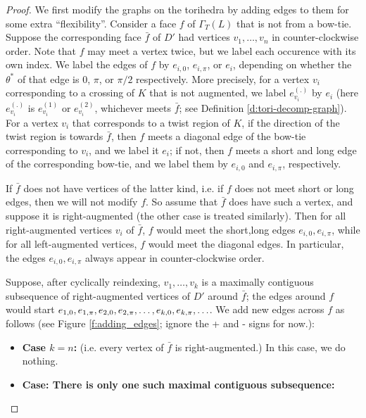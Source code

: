 \documentclass[11pt]{amsart}
\newcommand{\defref}[1]{Definition \ref{#1}}
\newcommand{\figref}[1]{Figure \ref{#1}}
\theoremstyle{plain}
\theoremstyle{definition}
\newcommand{\cm}{,\linebreak[1]}
\begin{document}
\begin{proof}
We first modify the graphs on the torihedra by adding edges
to them for some extra ``flexibility''.
Consider a face $f$ of $\Gamma_T(L)$ that is not from a bow-tie.
Suppose the corresponding face $\bar{f}$ of $D'$
had vertices $v_1,\ldots,v_n$ in counter-clockwise order.
Note that $f$ may meet a vertex twice,
but we label each occurence with its own index.
We label the edges of $f$ by $e_{i,0}$, $e_{i,\pi}$, or $e_i$,
depending on whether the $\theta^*$ of that edge
is $0$, $\pi$, or $\pi/2$ respectively.
More precisely, for a vertex $v_i$ corresponding to a crossing
of $K$ that is not augmented,
we label $e_{v_i}^{(.)}$ by $e_i$
(here $e_{v_i}^{(.)}$ is $e_{v_i}^{(1)}$ or $e_{v_i}^{(2)}$,
whichever meets $\bar{f}$; see \defref{d:tori-decomp-graph}).
For a vertex $v_i$ that corresponds to a twist region of $K$,
if the direction of the twist region is towards $\bar{f}$,
then $f$ meets a diagonal edge of the bow-tie corresponding to $v_i$,
and we label it $e_i$;
if not, then $f$ meets a short and long edge of the corresponding bow-tie,
and we label them by $e_{i,0}$ and $e_{i,\pi}$,
respectively.


If $\bar{f}$ does not have vertices of the latter kind,
i.e. if $f$ does not meet short or long edges,
then we will not modify $f$.
So assume that $\bar{f}$ does have such a vertex,
and suppose it is right-augmented
(the other case is treated similarly).
Then for all right-augmented vertices $v_i$ of $\bar{f}$,
$f$ would meet the short,long edges $e_{i,0},e_{i,\pi}$,
while for all left-augmented vertices,
$f$ would meet the diagonal edges.
In particular,
the edges $e_{i,0}, e_{i,\pi}$ always appear in counter-clockwise order.


Suppose, after cyclically reindexing, $v_1,\ldots,v_k$
is a maximally contiguous subsequence of right-augmented vertices
of $D'$ around $\bar{f}$;
the edges around $f$ would start
$e_{1,0} \cm e_{1,\pi} \cm e_{2,0} \cm e_{2,\pi} \cm \ldots
	\cm e_{k,0} \cm e_{k,\pi} \cm \ldots$.
We add new edges across $f$ as follows
(see \figref{f:adding_edges};
ignore the + and - signs for now.):


\begin{itemize}
\item \textbf{Case $k=n$:} (i.e. every vertex of $\bar{f}$ is right-augmented.)
In this case, we do nothing.

\item \textbf{Case: There is only one such maximal contiguous subsequence:}


\end{itemize}
\end{proof}
\end{document}
